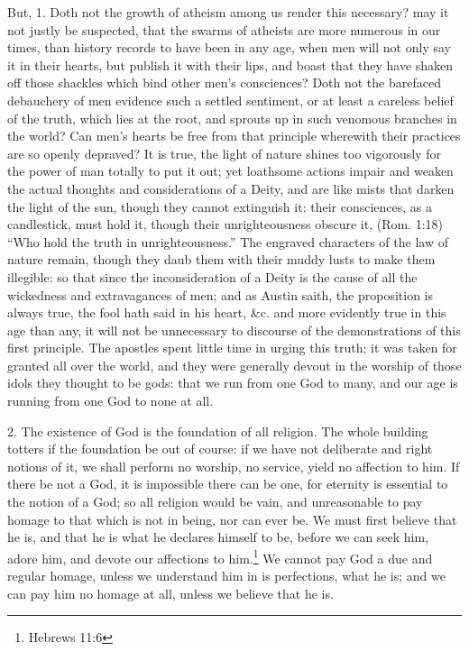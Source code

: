 \documentclass[a5paper]{book}
\begin{document}
But, 1. Doth not the growth of atheism among us render this necessary? 
    may it not justly be suspected, 
    that the swarms of atheists are more numerous in our times, 
    than history records to have been in any age, 
    when men will not only say it in their hearts, 
    but publish it with their lips, 
    and boast that they have shaken off those shackles 
    which bind other men’s consciences? 
Doth not the barefaced debauchery of men evidence such a settled sentiment, 
    or at least a careless belief of the truth, 
    which lies at the root, 
    and sprouts up in such venomous branches in the world? 
Can men’s hearts be free from that principle wherewith 
    their practices are so openly depraved? 
It is true, the light of nature shines too vigorously 
    for the power of man totally to put it out; 
    yet loathsome actions impair and weaken 
    the actual thoughts and considerations of a Deity, 
    and are like mists that darken the light of the sun, 
    though they cannot extinguish it: 
    their consciences, as a candlestick, must hold it, 
    though their unrighteousness obscure it, 
    (Rom. 1:18) ``Who hold the truth in unrighteousness.'' 
The engraved characters of the law of nature remain, 
    though they daub them with their muddy lusts to make them illegible: 
    so that since the inconsideration of a Deity 
    is the cause of all the wickedness and extravagances of men; 
    and as Austin saith,
    the proposition is always true, 
    the fool hath said in his heart, \&c.
    and more evidently true in this age than any, 
    it will not be unnecessary to discourse 
    of the demonstrations of this first principle. 
The apostles spent little time in urging this truth; 
    it was taken for granted all over the world, 
    and they were generally devout in the worship
    of those idols they thought to be gods: 
    that we run from one God to many, 
    and our age is running from one God to none at all.

2. The existence of God is the foundation of all religion. 
The whole building totters if the foundation be out of course: 
    if we have not deliberate and right notions of it, 
    we shall perform no worship, no service, yield no affection to him. 
If there be not a God, it is impossible there can be one, 
    for eternity is essential to the notion of a God; 
    so all religion would be vain, 
    and unreasonable to pay homage to that which is not in being, 
    nor can ever be. 
We must first believe that he is, 
    and that he is what he declares himself to be, 
    before we can seek him, adore him, and devote our affections to him.\footnote{Hebrews 11:6}
We cannot pay God a due and regular homage, 
    unless we understand him in is perfections, what he is; 
    and we can pay him no homage at all, unless we believe that he is.
\end{document}
